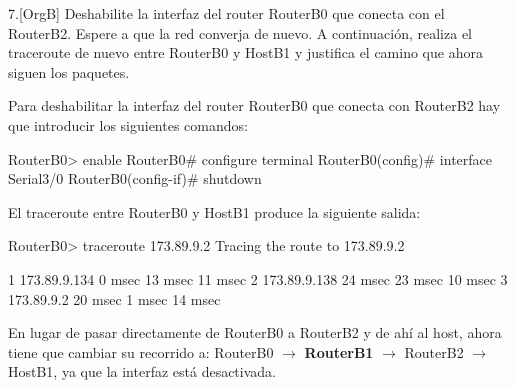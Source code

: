 \begin{ejer}
7.[OrgB]  Deshabilite la interfaz del router RouterB0 que conecta con el RouterB2. Espere a que la red converja de nuevo. A continuación, realiza el traceroute de nuevo entre RouterB0 y HostB1 y justifica el camino que ahora siguen los paquetes.
\end{ejer}
\par Para deshabilitar la interfaz del router RouterB0 que conecta con RouterB2 hay que introducir los siguientes comandos:
\begin{listing}[style=consola]
RouterB0> enable
RouterB0# configure terminal
RouterB0(config)# interface Serial3/0
RouterB0(config-if)# shutdown
\end{listing}
\par El traceroute entre RouterB0 y HostB1 produce la siguiente salida:
\begin{listing}[style=consola]
RouterB0> traceroute 173.89.9.2
Tracing the route to 173.89.9.2

  1   173.89.9.134    0 msec    13 msec   11 msec   
  2   173.89.9.138    24 msec   23 msec   10 msec   
  3   173.89.9.2      20 msec   1 msec    14 msec  
\end{listing}
\par En lugar de pasar directamente de RouterB0 a RouterB2 y de ahí al host, ahora tiene que cambiar su recorrido a: RouterB0 $\rightarrow$ \textbf{RouterB1} $\rightarrow$ RouterB2 $\rightarrow$ HostB1, ya que la interfaz está desactivada.


